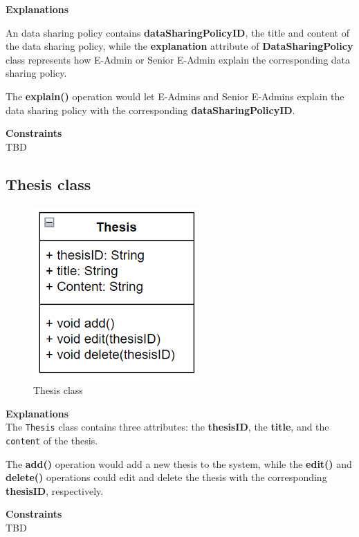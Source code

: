 \textbf{Explanations}

An data sharing policy contains \textbf{dataSharingPolicyID}, the title and content of the data sharing policy, while the \textbf{explanation} attribute of \textbf{DataSharingPolicy} class represents how E-Admin or Senior E-Admin explain the corresponding data sharing policy.

The \textbf{explain()} operation would let E-Admins and Senior E-Admins explain the data sharing policy with the corresponding \textbf{dataSharingPolicyID}.

\textbf{Constraints} \\
TBD

\subsection{Thesis class}

\begin{figure}[H]
    \centering
    \includegraphics[width=0.5\linewidth]{picture/3-5/3-5-3.png}
    \caption{Thesis class}
    \label{fig:enter-label}
\end{figure}

\textbf{Explanations} \\
The \texttt{Thesis} class contains three attributes: the \textbf{thesisID}, the \textbf{title}, and the \texttt{content} of the thesis.

The \textbf{add()} operation would add a new thesis to the system, while the \textbf{edit()} and \textbf{delete()} operations could edit and delete the thesis with the corresponding \textbf{thesisID}, respectively.

\textbf{Constraints} \\
TBD

